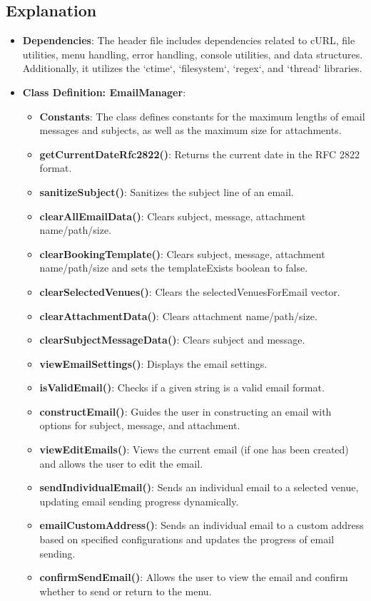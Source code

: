\documentclass{article}
\begin{document}
	\subsection*{Explanation}
	\begin{itemize}
		\item \textbf{Dependencies}: The header file includes dependencies related to cURL, file utilities, menu handling, error handling, console utilities, and data structures. Additionally, it utilizes the `ctime`, `filesystem`, `regex`, and `thread` libraries.
		\item \textbf{Class Definition: EmailManager}:
		\begin{itemize}
			\item \textbf{Constants}: The class defines constants for the maximum lengths of email messages and subjects, as well as the maximum size for attachments.
			\item \textbf{getCurrentDateRfc2822()}: Returns the current date in the RFC 2822 format.
			\item \textbf{sanitizeSubject()}: Sanitizes the subject line of an email.
			
			\item \textbf{clearAllEmailData()}: Clears subject, message, attachment name/path/size.
			\item \textbf{clearBookingTemplate()}: Clears subject, message, attachment name/path/size and sets the templateExists boolean to false.
			\item \textbf{clearSelectedVenues()}: Clears the selectedVenuesForEmail vector.
			\item \textbf{clearAttachmentData()}: Clears attachment name/path/size.
			\item \textbf{clearSubjectMessageData()}: Clears subject and message.			
			\item \textbf{viewEmailSettings()}: Displays the email settings.
			\item \textbf{isValidEmail()}: Checks if a given string is a valid email format.
			\item \textbf{constructEmail()}: Guides the user in constructing an email with options for subject, message, and attachment.
			\item \textbf{viewEditEmails()}: Views the current email (if one has been created) and allows the user to edit the email.			
			\item
			 \textbf{sendIndividualEmail()}: Sends an individual email to a selected venue, updating email sending progress dynamically.
			\item \textbf{emailCustomAddress()}: Sends an individual email to a custom address based on specified configurations and updates the progress of email sending.
			\item \textbf{confirmSendEmail()}: Allows the user to view the email and confirm whether to send or return to the menu.
			
		\end{itemize}
	\end{itemize}
	
\end{document}
